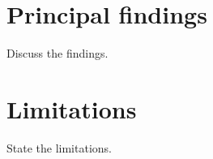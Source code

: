 \section{Principal findings}\label{sec:findings}
Discuss the findings.
\section{Limitations}\label{sec:limitations}
State the limitations.
